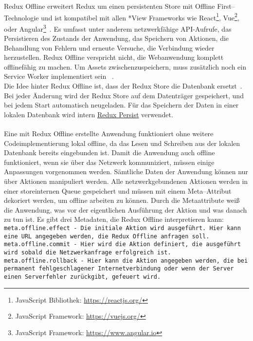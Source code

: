 % 
% 
Redux Offline erweitert Redux um einen persistenten Store mit Offline First--Technologie und ist kompatibel mit allen *View Frameworks wie React\footnote{JavaScript Bibliothek: \url{https://reactjs.org/}}, Vue\footnote{JavaScript Framework: \url{https://vuejs.org/}}, oder Angular\footnote{JavaScript Framework: \url{https://www.angular.io}}~\cite{redux-offline-compabilaty}.
Es umfasst unter anderem netzwerkfähige \gls{API}-Aufrufe, das Persistieren des Zustands der Anwendung, das Speichern von Aktionen, die Behandlung von Fehlern und erneute Versuche, die Verbindung wieder herzustellen.
Redux Offline verspricht nicht, die Webanwendung komplett offlinefähig zu machen.
Um \gls{Assets} zwischenzuspeichern, muss zusätzlich noch ein Service Worker implementiert sein ~\cite{redux-offline-gh}.\\
Die Idee hinter Redux Offline ist, dass der Redux Store die Datenbank ersetzt~\cite{redux-offline}.
Bei jeder Änderung wird der Redux Store auf dem Datenträger gespeichert, und bei jedem Start automatisch neugeladen.
Für das Speichern der Daten in einer lokalen Datenbank wird intern \hyperref[sub:reduxpersist]{Redux Persist} verwendet.\\\\
%
%
Eine mit Redux Offline erstellte Anwendung funktioniert ohne weitere Codeimplementierung lokal offline, da das Lesen und Schreiben aus der lokalen Datenbank bereits eingebunden ist.
Damit die Anwendung auch offline funktioniert, wenn sie über das Netzwerk kommuniziert, müssen einige Anpassungen vorgenommen werden.
Sämtliche Daten der Anwendung können nur über Aktionen manipuliert werden. 
Alle netzwerkgebundenen Aktionen werden in einer storeinternen \gls{Queue} gespeichert und müssen mit einem Meta--Attribut dekoriert werden, um offline arbeiten zu können. Durch die Metaattribute weiß die Anwendung, was vor der eigentlichen Ausführung der Aktion und was danach zu tun ist. 
Es gibt drei Metadaten, die Redux Offline interpretieren kann:\\
\tt{meta.offline.effect} - Die initiale Aktion wird ausgeführt. Hier kann eine URL angegeben werden, die Redux Offline anfragen soll.\\
\tt{meta.offline.commit} - Hier wird die Aktion definiert, die ausgeführt wird sobald die Netzwerkanfrage erfolgreich ist.\\
\tt{meta.offline.rollback} - Hier kann die Aktion angegeben werden, die bei permanent fehlgeschlagener Internetverbindung oder wenn der Server einen Serverfehler zurückgibt, gefeuert wird.
